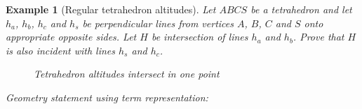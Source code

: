 \documentclass[final,1p,times,authoryear]{elsarticle}
\newtheorem{example}[theorem]{Example}
\begin{document}
\begin{example}[Regular tetrahedron altitudes] 
Let $ABCS$ be a tetrahedron and let $h_a$, $h_b$, $h_c$ and $h_s$ be
perpendicular lines from vertices $A$, $B$, $C$ and $S$ onto
appropriate opposite sides. Let $H$ be intersection of lines $h_a$ and
$h_b$. Prove that $H$ is also incident with lines $h_s$ and $h_c$.

\begin{figure}[!hb]
\begin{center}

\end{center}
\caption{Tetrahedron altitudes intersect in one point}
\end{figure}

Geometry statement using term representation:



\end{example}
\end{document}
